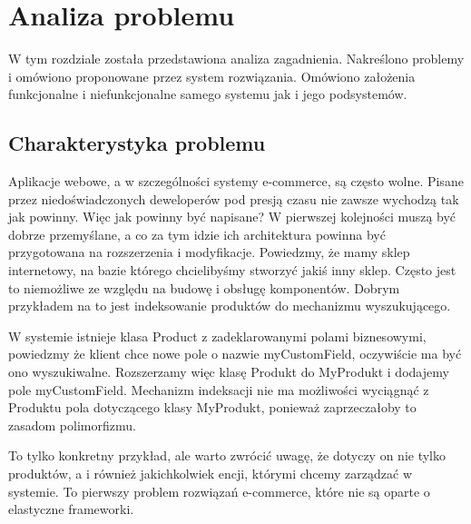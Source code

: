 \chapter{Analiza problemu}
\thispagestyle{chapterBeginStyle}
\label{rozdzial1}

W tym rozdziale została przedstawiona analiza zagadnienia. Nakreślono problemy i omówiono proponowane przez system rozwiązania. Omówiono założenia funkcjonalne i niefunkcjonalne samego systemu jak i jego podsystemów.


\section{Charakterystyka problemu}
Aplikacje webowe, a w szczególności systemy e-commerce, są często wolne. Pisane przez niedoświadczonych deweloperów pod presją czasu nie zawsze wychodzą tak jak powinny. Więc jak powinny być napisane? W pierwszej kolejności muszą być dobrze przemyślane, a co za tym idzie ich architektura powinna być przygotowana na rozszerzenia i modyfikacje. Powiedzmy, że mamy sklep internetowy, na bazie którego chcielibyśmy stworzyć jakiś inny sklep. Często jest to niemożliwe ze względu na budowę i obsługę komponentów. Dobrym przykładem na to jest indeksowanie produktów do mechanizmu wyszukującego.
\begin{example}
	W systemie istnieje klasa Product z zadeklarowanymi polami biznesowymi, powiedzmy że klient chce nowe pole o nazwie myCustomField, oczywiście ma być ono wyszukiwalne. Rozszerzamy więc klasę Produkt do MyProdukt i dodajemy pole myCustomField. Mechanizm indeksacji nie ma możliwości wyciągnąć z Produktu pola dotyczącego klasy MyProdukt, ponieważ zaprzeczałoby to zasadom polimorfizmu.
\end{example} 
To tylko konkretny przykład, ale warto zwrócić uwagę, że dotyczy on nie tylko produktów, a i również jakichkolwiek encji, którymi chcemy zarządzać w systemie. To pierwszy problem rozwiązań e-commerce, które nie są oparte o elastyczne frameworki. 

